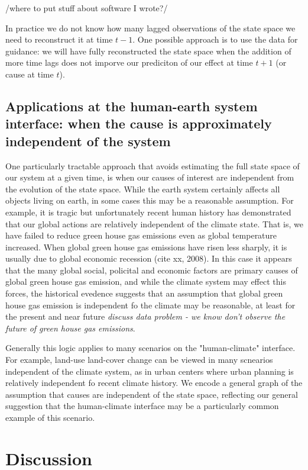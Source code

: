 \documentclass[12pt]{article}
\begin{document}
/where to put stuff about software I wrote?/

In practice we do not know how many lagged observations of the state
space we need to reconstruct it at time $t-1$. One possible approach
is to use the data for guidance: we will have fully reconstructed the
state space when the addition of more time lags does not imporve our
prediciton of our effect at time \(t+1\) (or cause at time $t$).


\subsection{Applications at the human-earth system interface: when the
cause is approximately independent of the system}
\label{human}

One particularly tractable approach that avoids estimating the full
state space of our system at a given time, is when our causes of
interest are independent from the evolution of the state space. While
the earth system certainly affects all objects living on earth, in
some cases this may be a reasonable assumption. For example, it is
tragic but unfortunately recent human history has demonstrated that
our global actions are relatively independent of the climate
state. That is, we have failed to reduce green house gas emissions
even as global temperature increased. When global green house gas
emissions have risen less sharply, it is usually due to global
economic recession (cite xx, 2008). In this case it appears that the
many global social, policital and economic factors are primary causes
of global green house gas emission, and while the climate system may
effect this forces, the historical evedence suggests that an
assumption that global green house gas emission is independent fo the
climate may be reasonable, at least for the present and near future
\emph{discuss data problem - we know don't observe the future of green
  house gas emissions}.

Generally this logic applies to many scenarios on the
"human-climate" interface. For example, land-use land-cover change
can be viewed in many scnearios independent of the climate system,
as in urban centers where urban planning is relatively independent
fo recent climate history. We encode a general graph of the
assumption that causes are independent of the state space,
reflecting our general suggestion that the human-climate interface
may be a particularly common example of this scenario.

\section{Discussion}
\end{document}
